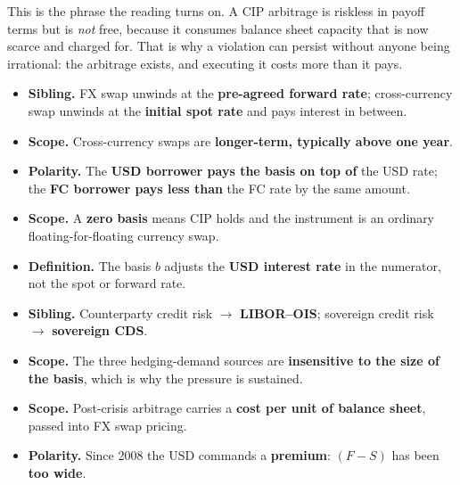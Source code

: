 \begin{lrtrapbox}
This is the phrase the reading turns on. A CIP arbitrage is riskless in payoff terms but is \emph{not} free, because it consumes balance sheet capacity that is now scarce and charged for. That is why a violation can persist without anyone being irrational: the arbitrage exists, and executing it costs more than it pays.
\end{lrtrapbox}

\begin{lrtrapbox}
\begin{itemize}
\item \textbf{Sibling.} FX swap unwinds at the \textbf{pre-agreed forward rate}; cross-currency swap unwinds at the \textbf{initial spot rate} and pays interest in between.
\item \textbf{Scope.} Cross-currency swaps are \textbf{longer-term, typically above one year}.
\item \textbf{Polarity.} The \textbf{USD borrower pays the basis on top of} the USD rate; the \textbf{FC borrower pays less than} the FC rate by the same amount.
\item \textbf{Scope.} A \textbf{zero basis} means CIP holds and the instrument is an ordinary floating-for-floating currency swap.
\item \textbf{Definition.} The basis $b$ adjusts the \textbf{USD interest rate} in the numerator, not the spot or forward rate.
\item \textbf{Sibling.} Counterparty credit risk $\rightarrow$ \textbf{LIBOR--OIS}; sovereign credit risk $\rightarrow$ \textbf{sovereign CDS}.
\item \textbf{Scope.} The three hedging-demand sources are \textbf{insensitive to the size of the basis}, which is why the pressure is sustained.
\item \textbf{Scope.} Post-crisis arbitrage carries a \textbf{cost per unit of balance sheet}, passed into FX swap pricing.
\item \textbf{Polarity.} Since 2008 the USD commands a \textbf{premium}: $(F-S)$ has been \textbf{too wide}.
\end{itemize}
\end{lrtrapbox}

